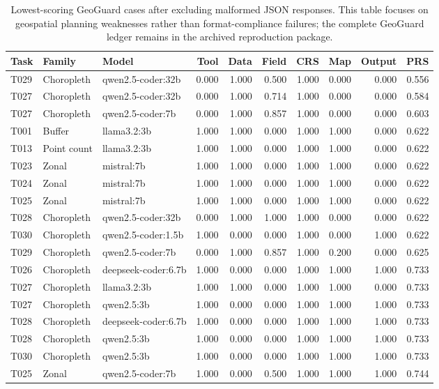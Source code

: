 \begin{table}[H]
\centering
\caption{Lowest-scoring GeoGuard cases after excluding malformed JSON responses. This table focuses on geospatial planning weaknesses rather than format-compliance failures; the complete GeoGuard ledger remains in the archived reproduction package.}
\label{tab:geoguard-hard-cases}
\small
\setlength{\tabcolsep}{2pt}
\begin{tabular}{lllrrrrrrr}
\toprule
Task & Family & Model & Tool & Data & Field & CRS & Map & Output & PRS \\
\midrule
T029 & Choropleth & qwen2.5-coder:32b & 0.000 & 1.000 & 0.500 & 1.000 & 0.000 & 0.000 & 0.556 \\
T027 & Choropleth & qwen2.5-coder:32b & 0.000 & 1.000 & 0.714 & 1.000 & 0.000 & 0.000 & 0.584 \\
T027 & Choropleth & qwen2.5-coder:7b & 0.000 & 1.000 & 0.857 & 1.000 & 0.000 & 0.000 & 0.603 \\
T001 & Buffer & llama3.2:3b & 1.000 & 1.000 & 0.000 & 1.000 & 1.000 & 0.000 & 0.622 \\
T013 & Point count & llama3.2:3b & 1.000 & 1.000 & 0.000 & 1.000 & 1.000 & 0.000 & 0.622 \\
T023 & Zonal & mistral:7b & 1.000 & 1.000 & 0.000 & 1.000 & 1.000 & 0.000 & 0.622 \\
T024 & Zonal & mistral:7b & 1.000 & 1.000 & 0.000 & 1.000 & 1.000 & 0.000 & 0.622 \\
T025 & Zonal & mistral:7b & 1.000 & 1.000 & 0.000 & 1.000 & 1.000 & 0.000 & 0.622 \\
T028 & Choropleth & qwen2.5-coder:32b & 0.000 & 1.000 & 1.000 & 1.000 & 0.000 & 0.000 & 0.622 \\
T030 & Choropleth & qwen2.5-coder:1.5b & 1.000 & 0.000 & 0.000 & 1.000 & 0.000 & 1.000 & 0.622 \\
T029 & Choropleth & qwen2.5-coder:7b & 0.000 & 1.000 & 0.857 & 1.000 & 0.200 & 0.000 & 0.625 \\
T026 & Choropleth & deepseek-coder:6.7b & 1.000 & 0.000 & 0.000 & 1.000 & 1.000 & 1.000 & 0.733 \\
T027 & Choropleth & llama3.2:3b & 1.000 & 1.000 & 0.000 & 1.000 & 1.000 & 0.000 & 0.733 \\
T027 & Choropleth & qwen2.5:3b & 1.000 & 0.000 & 0.000 & 1.000 & 1.000 & 1.000 & 0.733 \\
T028 & Choropleth & deepseek-coder:6.7b & 1.000 & 0.000 & 0.000 & 1.000 & 1.000 & 1.000 & 0.733 \\
T028 & Choropleth & qwen2.5:3b & 1.000 & 0.000 & 0.000 & 1.000 & 1.000 & 1.000 & 0.733 \\
T030 & Choropleth & qwen2.5:3b & 1.000 & 0.000 & 0.000 & 1.000 & 1.000 & 1.000 & 0.733 \\
T025 & Zonal & qwen2.5-coder:7b & 1.000 & 0.000 & 0.500 & 1.000 & 1.000 & 1.000 & 0.744 \\
\bottomrule
\end{tabular}
\end{table}
